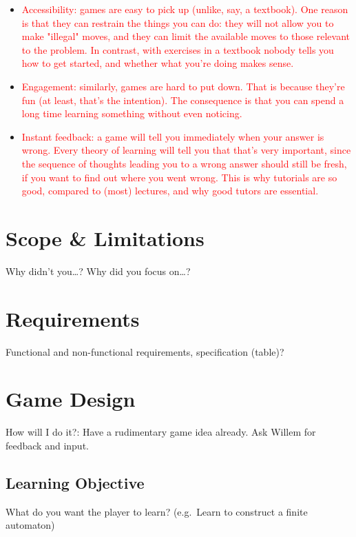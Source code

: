 \documentclass[a4paper,11pt]{article}
\newcommand{\draft}[1]{\textcolor{red}{#1}} %
\begin{document}
\begin{enumerate}
\begin{itemize}
\begin{itemize}
        \item \draft{Accessibility: games are easy to pick up (unlike, say, a textbook). One reason is that they can restrain the things you can do: they will not allow you to make "illegal" moves, and they can limit the available moves to those relevant to the problem. In contrast, with exercises in a textbook nobody tells you how to get started, and whether what you're doing makes sense.}
        \item \draft{Engagement: similarly, games are hard to put down. That is because they're fun (at least, that's the intention). The consequence is that you can spend a long time learning something without even noticing.}
        \item \draft{Instant feedback: a game will tell you immediately when your answer is wrong. Every theory of learning will tell you that that's very important, since the sequence of thoughts leading you to a wrong answer should still be fresh, if you want to find out where you went wrong. This is why tutorials are so good, compared to (most) lectures, and why good tutors are essential.}
      \end{itemize}
    \end{itemize}
\end{enumerate}

\section{Scope \& Limitations} %
Why didn't you\dots? Why did you focus on\dots?

\section{Requirements} %
Functional and non-functional requirements, specification (table)?

\section{Game Design} %
How will I do it?: Have a rudimentary game idea already. Ask Willem for feedback and input.

\subsection{Learning Objective}
What do you want the player to learn? (e.g.\ Learn to construct a finite automaton)
\end{document}
